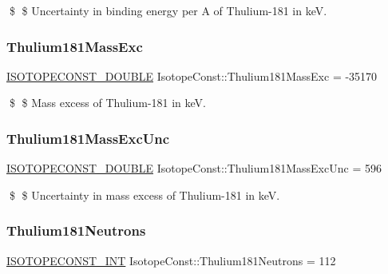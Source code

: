 \$ \$ Uncertainty in binding energy per A of Thulium-\/181 in keV. \mbox{\label{group___isotope_const-_thulium-_tm181_ga2d29754fc2477b998207cdff624e61d4}} 
\subsubsection{\texorpdfstring{Thulium181\+Mass\+Exc}{Thulium181MassExc}}
{\footnotesize\ttfamily \mbox{\hyperlink{group___isotope_const-_macros_ga8f45a7272ce02c0b4c65c44636ed719a}{I\+S\+O\+T\+O\+P\+E\+C\+O\+N\+S\+T\+\_\+\+D\+O\+U\+B\+LE}} Isotope\+Const\+::\+Thulium181\+Mass\+Exc = -\/35170}

\$ \$ Mass excess of Thulium-\/181 in keV. \mbox{\label{group___isotope_const-_thulium-_tm181_ga5dae6e8e45787efa80e952faa5db47ff}} 
\subsubsection{\texorpdfstring{Thulium181\+Mass\+Exc\+Unc}{Thulium181MassExcUnc}}
{\footnotesize\ttfamily \mbox{\hyperlink{group___isotope_const-_macros_ga8f45a7272ce02c0b4c65c44636ed719a}{I\+S\+O\+T\+O\+P\+E\+C\+O\+N\+S\+T\+\_\+\+D\+O\+U\+B\+LE}} Isotope\+Const\+::\+Thulium181\+Mass\+Exc\+Unc = 596}

\$ \$ Uncertainty in mass excess of Thulium-\/181 in keV. \mbox{\label{group___isotope_const-_thulium-_tm181_ga1c250dbebfc0d5f674452a96fc031e60}} 
\subsubsection{\texorpdfstring{Thulium181\+Neutrons}{Thulium181Neutrons}}
{\footnotesize\ttfamily \mbox{\hyperlink{group___isotope_const-_macros_ga5f18360b3e99483a35c32d789e62621c}{I\+S\+O\+T\+O\+P\+E\+C\+O\+N\+S\+T\+\_\+\+I\+NT}} Isotope\+Const\+::\+Thulium181\+Neutrons = 112}

